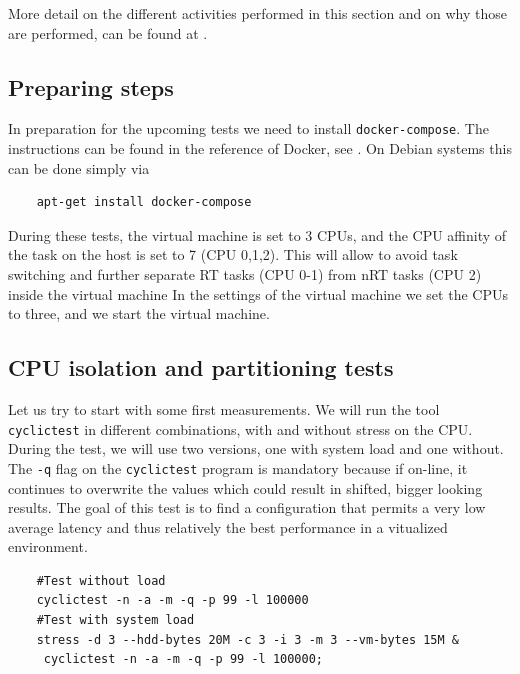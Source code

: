 \documentclass[]{scrartcl}
\begin{document}
More detail on the different activities performed in this section and on why those are performed, can be found at \cite{lrt01}.

\subsection{Preparing steps}

In preparation for the upcoming tests we need to install \texttt{docker-compose}.
The instructions can be found in the reference of Docker, see \cite{docker05}. 
On Debian systems this can be done simply via 

\begin{verbatim}
	apt-get install docker-compose
\end{verbatim}

During these tests, the virtual machine is set to 3 CPUs, and the CPU affinity of the task on the host is set to 7 (CPU 0,1,2). This will allow to avoid task switching and further separate RT tasks (CPU 0-1) from nRT tasks (CPU 2) inside the virtual machine
In the settings of the virtual machine we set the CPUs to three, and we start the virtual machine.  
%
%

\subsection{CPU isolation and partitioning tests}

Let us try to start with some first measurements. We will run the tool \texttt{cyclictest} in different combinations, with and without stress on the CPU. During the test, we will use two versions, one with system load and one without. The \texttt{-q} flag on the \texttt{cyclictest} program is mandatory because if on-line, it continues to overwrite the values which could result in shifted, bigger looking results. The goal of this test is to find a configuration that permits a very low average latency and thus relatively the best performance in a vitualized environment.

\begin{verbatim}
	#Test without load
	cyclictest -n -a -m -q -p 99 -l 100000
	#Test with system load
	stress -d 3 --hdd-bytes 20M -c 3 -i 3 -m 3 --vm-bytes 15M &
	 cyclictest -n -a -m -q -p 99 -l 100000;
\end{verbatim}
\end{document}
